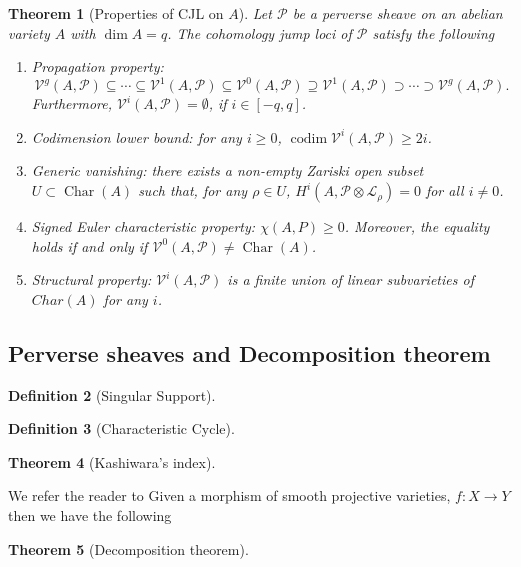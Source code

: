 \documentclass[12pt,reqno]{amsart}
\newtheorem{theorem}{Theorem}[section]
\theoremstyle{question}
\theoremstyle{definition}
\newtheorem{definition}[theorem]{Definition}
\theoremstyle{remark}
\theoremstyle{cited}
\theoremstyle{citeddef}
\DeclareMathOperator{\codim}{codim}              %
\DeclareMathOperator{\Char}{Char}
\newcommand{\sL}{\mathcal{L}}
\newcommand{\sP}{\mathcal{P}}
\newcommand\sV{{\mathcal V}}
\begin{document}
\begin{theorem}[Properties of CJL on $A$]
Let $\sP$ be a perverse sheave on an abelian variety $A$ with $\dim A = q$.
The
cohomology jump loci of $\sP$ satisfy the following
\begin{enumerate}
	\item Propagation property:
\[\sV^g(A, \sP) \subseteq \cdots\subseteq \sV^1(A, \sP) 
\subseteq \sV^0(A, \sP) \supseteq \sV^1(A, \sP) \supset\cdots\supset \sV^g(A, \sP).\]
Furthermore, $\sV^i(A, \sP) = \emptyset$, if $i \in [-q, q]$.
\item Codimension lower bound: for any $i \geq 0$,
$\codim \sV^i(A, \sP) \geq 2i$.
\item Generic vanishing: there exists a non-empty Zariski open subset $U \subset \Char(A)$
such that, for any $\rho\in U$, $H^i(A, \sP 
\otimes \sL_{\rho}) = 0$ for all $i \neq 0$.
\item Signed Euler characteristic property:
$\chi(A, P) \geq 0$.
Moreover, the equality holds if and only if $\sV^0(A, \sP) \neq \Char(A)$.
\item Structural property: $\sV^i(A, \sP)$ is a finite union of linear subvarieties of $Char(A)$ for any $i$.
\end{enumerate}
\label{thm:gvperverse}
\end{theorem} 



\subsection{Perverse sheaves and Decomposition theorem}
\begin{definition}[Singular Support]


\end{definition}
\begin{definition}[Characteristic Cycle]


\end{definition}

\begin{theorem}[Kashiwara's index]

\label{thm:indextheorem}
\end{theorem}
We refer the reader to
\cite[Section 4.5]{HTT08 }
Given a morphism of smooth projective varieties, 
$f\colon X\to Y$ then we have the following
\begin{theorem}[Decomposition theorem]


\label{thm:}
\end{theorem}
\end{document}
